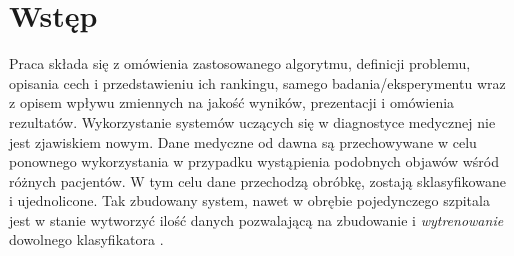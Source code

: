 \section{Wstęp}

Praca składa się z omówienia zastosowanego algorytmu, definicji problemu, opisania cech i przedstawieniu ich rankingu, samego badania/eksperymentu wraz z opisem wpływu zmiennych na jakość wyników, prezentacji i omówienia rezultatów. 
\bigbreak
Wykorzystanie systemów uczących się w diagnostyce medycznej nie jest zjawiskiem nowym. Dane medyczne od dawna są przechowywane w celu ponownego wykorzystania w przypadku wystąpienia podobnych objawów wśród różnych pacjentów. W tym celu dane przechodzą obróbkę, zostają sklasyfikowane i ujednolicone. Tak zbudowany system, nawet w obrębie pojedynczego szpitala jest w stanie wytworzyć ilość danych pozwalającą na zbudowanie i \textit{wytrenowanie} dowolnego klasyfikatora \cite{1}.